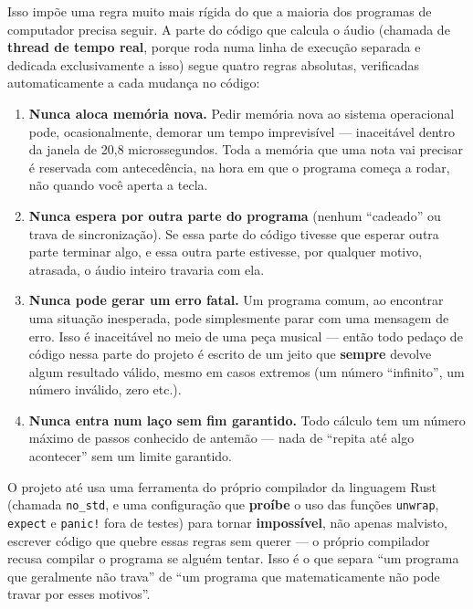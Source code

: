 \documentclass[11pt,oneside]{book}
\begin{document}
Isso impõe uma regra muito mais rígida do que a maioria dos programas de
computador precisa seguir. A parte do código que calcula o áudio (chamada
de \textbf{thread de tempo real}, porque roda numa linha de execução
separada e dedicada exclusivamente a isso) segue quatro regras absolutas,
verificadas automaticamente a cada mudança no código:

\begin{enumerate}[leftmargin=1.6em]
\item \textbf{Nunca aloca memória nova.} Pedir memória nova ao sistema
operacional pode, ocasionalmente, demorar um tempo imprevisível ---
inaceitável dentro da janela de 20,8 microssegundos. Toda a memória que
uma nota vai precisar é reservada com antecedência, na hora em que o
programa começa a rodar, não quando você aperta a tecla.
\item \textbf{Nunca espera por outra parte do programa} (nenhum
\enquote{cadeado} ou trava de sincronização). Se essa parte do código
tivesse que esperar outra parte terminar algo, e essa outra parte
estivesse, por qualquer motivo, atrasada, o áudio inteiro travaria com
ela.
\item \textbf{Nunca pode gerar um erro fatal.} Um programa comum, ao
encontrar uma situação inesperada, pode simplesmente parar com uma
mensagem de erro. Isso é inaceitável no meio de uma peça musical --- então
todo pedaço de código nessa parte do projeto é escrito de um jeito que
\textbf{sempre} devolve algum resultado válido, mesmo em casos extremos
(um número \enquote{infinito}, um número inválido, zero etc.).
\item \textbf{Nunca entra num laço sem fim garantido.} Todo cálculo tem um
número máximo de passos conhecido de antemão --- nada de \enquote{repita
até algo acontecer} sem um limite garantido.
\end{enumerate}

O projeto até usa uma ferramenta do próprio compilador da linguagem Rust
(chamada \texttt{no\_std}, e uma configuração que \textbf{proíbe} o uso das
funções \texttt{unwrap}, \texttt{expect} e \texttt{panic!} fora de testes)
para tornar \textbf{impossível}, não apenas malvisto, escrever código que
quebre essas regras sem querer --- o próprio compilador recusa compilar o
programa se alguém tentar. Isso é o que separa \enquote{um programa que
geralmente não trava} de \enquote{um programa que matematicamente não pode
travar por esses motivos}.

\end{document}

